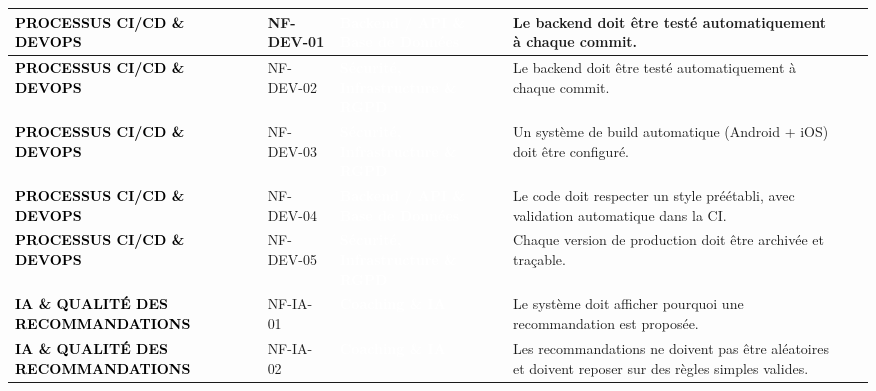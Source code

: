 \begin{longtable}{|P{2.15cm}|P{1.55cm}|P{2.35cm}|P{5.60cm}|P{1.65cm}|P{1.45cm}|}
\textcolor{black}{\textbf{PROCESSUS CI/CD \& DEVOPS}} & NF-DEV-01 & \textcolor{white}{\textbf{Backend / API \& Base de Données}} & Le backend doit être testé automatiquement à chaque commit. &  &  \\ \hline
{}
\textcolor{black}{\textbf{PROCESSUS CI/CD \& DEVOPS}} & NF-DEV-02 & \textcolor{white}{\textbf{Sécurité, Infrastructure \& RGPD}} & Le backend doit être testé automatiquement à chaque commit. &  &  \\ \hline
{}
\textcolor{black}{\textbf{PROCESSUS CI/CD \& DEVOPS}} & NF-DEV-03 & \textcolor{white}{\textbf{Sécurité, Infrastructure \& RGPD}} & Un système de build automatique (Android + iOS) doit être configuré. &  &  \\ \hline
{}
\textcolor{black}{\textbf{PROCESSUS CI/CD \& DEVOPS}} & NF-DEV-04 & \textcolor{white}{\textbf{Backend / API \& Base de Données}} & Le code doit respecter un style préétabli, avec validation automatique dans la CI. &  &  \\ \hline
{}
\textcolor{black}{\textbf{PROCESSUS CI/CD \& DEVOPS}} & NF-DEV-05 & \textcolor{white}{\textbf{Sécurité, Infrastructure \& RGPD}} & Chaque version de production doit être archivée et traçable. &  &  \\ \hline
{}
\textcolor{black}{\textbf{IA \& QUALITÉ DES RECOMMANDATIONS}} & NF-IA-01 & \textcolor{white}{\textbf{Coaching \& IA}} & Le système doit afficher pourquoi une recommandation est proposée. &  &  \\ \hline
{}
\textcolor{black}{\textbf{IA \& QUALITÉ DES RECOMMANDATIONS}} & NF-IA-02 & \textcolor{white}{\textbf{Coaching \& IA}} & Les recommandations ne doivent pas être aléatoires et doivent reposer sur des règles simples valides. &  &  \\ \hline

\end{longtable}

